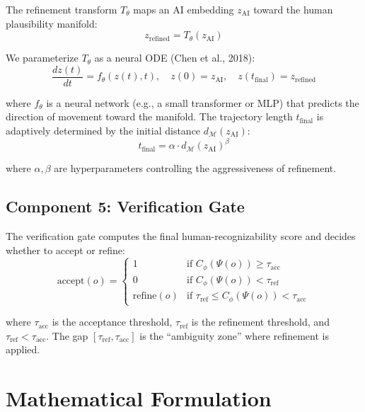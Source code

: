 \documentclass[12pt,oneside]{article}
\begin{document}
The refinement transform $T_\theta$ maps an AI embedding $z_\text{AI}$ toward the human plausibility manifold:
\begin{equation}
z_\text{refined} = T_\theta(z_\text{AI})
\end{equation}

We parameterize $T_\theta$ as a neural ODE (Chen et al., 2018):
\begin{equation}
\frac{dz(t)}{dt} = f_\theta(z(t), t), \quad z(0) = z_\text{AI}, \quad z(t_\text{final}) = z_\text{refined}
\end{equation}

where $f_\theta$ is a neural network (e.g., a small transformer or MLP) that predicts the direction of movement toward the manifold. The trajectory length $t_\text{final}$ is adaptively determined by the initial distance $d_\mathcal{M}(z_\text{AI})$:
\begin{equation}
t_\text{final} = \alpha \cdot d_\mathcal{M}(z_\text{AI})^\beta
\end{equation}

where $\alpha, \beta$ are hyperparameters controlling the aggressiveness of refinement.

\subsection{Component 5: Verification Gate}

The verification gate computes the final human-recognizability score and decides whether to accept or refine:
\begin{equation}
\text{accept}(o) = \begin{cases}
1 & \text{if } C_\phi(\Psi(o)) \geq \tau_\text{acc} \\
0 & \text{if } C_\phi(\Psi(o)) < \tau_\text{ref} \\
\text{refine}(o) & \text{if } \tau_\text{ref} \leq C_\phi(\Psi(o)) < \tau_\text{acc}
\end{cases}
\end{equation}

where $\tau_\text{acc}$ is the acceptance threshold, $\tau_\text{ref}$ is the refinement threshold, and $\tau_\text{ref} < \tau_\text{acc}$. The gap $[\tau_\text{ref}, \tau_\text{acc}]$ is the ``ambiguity zone'' where refinement is applied.

\section{Mathematical Formulation}
\end{document}
